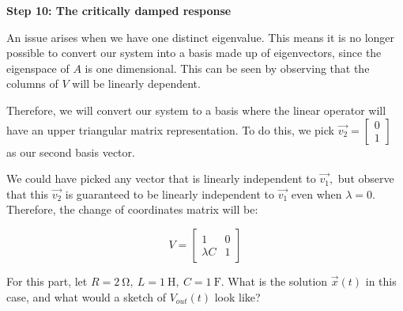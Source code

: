 \qitem \textbf{Step 10: The critically damped response}

An issue arises when we have one distinct eigenvalue. This means it is no longer possible to convert our system into a basis made up of eigenvectors, since the eigenspace of $A$ is one dimensional. This can be seen by observing that the columns of $V$ will be linearly dependent. \vskip 1pt

Therefore, we will convert our system to a basis where the linear operator will have an upper triangular matrix representation. To do this, we pick $\vec{v_2} = \begin{bmatrix} 0 \\ 1 \end{bmatrix}$ as our second basis vector.

We could have picked any vector that is linearly independent to $\vec{v_1},$ but observe that this $\vec{v_2}$ is guaranteed to be linearly independent to $\vec{v_1}$ even when $\lambda = 0.$ Therefore, the change of coordinates matrix will be:

$$ V = \begin{bmatrix} 1 & 0 \\ \lambda C & 1 \end{bmatrix} $$

For this part, let $R = \SI{2}{\ohm}, \ L = \SI{1}{\henry}, \ C = \SI{1}{\farad}.$ 
What is the solution $\vec{x}(t)$ in this case, and what would a sketch of $V_{out}(t)$ look like?


